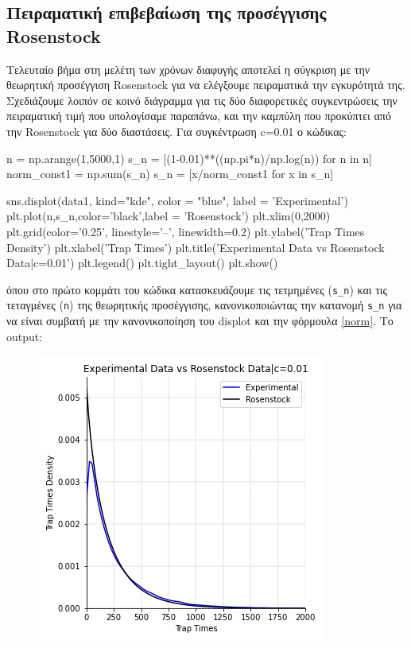 \subsection{Πειραματική επιβεβαίωση της προσέγγισης {\en Rosenstock}}
\label{rosen}
Τελευταίο βήμα στη μελέτη των χρόνων διαφυγής αποτελεί η σύγκριση με την θεωρητική προσέγγιση {\en Rosenstock} για να ελέγξουμε πειραματικά την εγκυρότητά της. Σχεδιάζουμε λοιπόν σε κοινό διάγραμμα για τις δύο διαφορετικές συγκεντρώσεις την πειραματική τιμή που υπολογίσαμε παραπάνω, και την καμπύλη που προκύπτει από την {\en Rosenstock} για δύο διαστάσεις.
\noindent
Για συγκέντρωση {\en c=0.01} ο κώδικας:
\en 
\begin{python}
n = np.arange(1,5000,1)
s_n = [(1-0.01)**((np.pi*n)/np.log(n)) for n in n]
norm_const1 = np.sum(s_n)
s_n = [x/norm_const1 for x in s_n]

sns.displot(data1, kind="kde", color = "blue", label = 'Experimental')
plt.plot(n,s_n,color='black',label = 'Rosenstock')
plt.xlim(0,2000)
plt.grid(color='0.25', linestyle='--', linewidth=0.2)
plt.ylabel('Trap Times Density')
plt.xlabel('Trap Times')
plt.title('Experimental Data vs Rosenstock Data|c=0.01')
plt.legend()
plt.tight_layout()
plt.show()
\end{python}
\gr 
όπου στο πρώτο κομμάτι του κώδικα κατασκευάζουμε τις τετμημένες ({\en \texttt{s\_n}}) και τις τεταγμένες ({\en \texttt{n}}) της θεωρητικής προσέγγισης, κανονικοποιώντας την κατανομή {\en \texttt{s\_n}} για να είναι συμβατή με την κανονικοποίηση του {\en displot} και την φόρμουλα \eqref{norm}.
\newpage
\noindent
Το {\en output}:
\begin{figure}[H]
\begin{center}
\includegraphics[scale=0.7]{figures/Rosenstock_001.png}
\end{center}
\end{figure}
